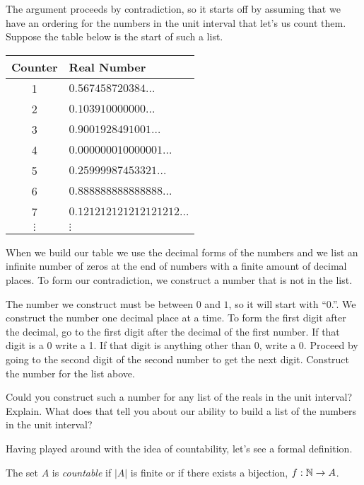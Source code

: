 The argument proceeds by contradiction, so it starts off by assuming that we have an ordering for the numbers in the unit interval that let's us count them.  Suppose the table below is the start of such a list.
	\begin{center}
	\begin{tabular}{c|l}
	Counter & Real Number \\
	\hline
	1 & $0.567458720384\ldots$\\
	2 & $0.103910000000\ldots$\\
	3 & $0.9001928491001\ldots$\\
	4 & $0.000000010000001\ldots$\\
	5 & $0.25999987453321\ldots$\\
	6 & $0.888888888888888\ldots$\\
	7 & $0.121212121212121212\ldots$\\
	$\vdots$ & $\vdots$
	\end{tabular}
	\end{center}
When we build our table we use the decimal forms of the numbers and we list an infinite number of zeros at the end of numbers with a finite amount of decimal places.  To form our contradiction, we construct a number that is not in the list.
\begin{question}[resume]
\item The number we construct must be between $0$ and $1$, so it will start with ``0.''.  We construct the number one decimal place at a time.  To form the first digit after the decimal, go to the first digit after the decimal of the first number.  If that digit is a 0 write a 1.  If that digit is anything other than 0, write a 0.  Proceed by going to the second digit of the second number to get the next digit.  Construct the number for the list above.
\vspace{2in}
\item Could you construct such a number for any list of the reals in the unit interval?  Explain.  What does that tell you about our ability to build a list of the numbers in the unit interval?

\vspace{2in}
\end{question}

Having played around with the idea of countability, let's see a formal definition.

\begin{definition}[Countable]  The set $A$ is \textit{countable} if $|A|$ is finite or if there exists a bijection, $f:\mathbb{N} \to A$.
\end{definition}

